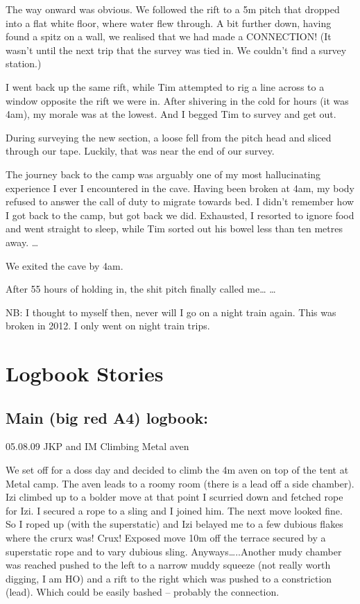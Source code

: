 The way onward was obvious. We followed the rift to a 5m pitch that
dropped into a flat white floor, where water flew through. A bit further
down, having found a spitz on a wall, we realised that we had made a
CONNECTION! (It wasn't until the next trip that the survey was tied in.
We couldn't find a survey station.)

I went back up the same rift, while Tim attempted to rig a line across
to a window opposite the rift we were in. After shivering in the cold
for hours (it was 4am), my morale was at the lowest. And I begged Tim to
survey and get out.

During surveying the new section, a loose fell from the pitch head and
sliced through our tape. Luckily, that was near the end of our survey.

The journey back to the camp was arguably one of my most hallucinating
experience I ever I encountered in the cave. Having been broken at 4am,
my body refused to answer the call of duty to migrate towards bed. I
didn't remember how I got back to the camp, but got back we did.
Exhausted, I resorted to ignore food and went straight to sleep, while
Tim sorted out his bowel less than ten metres away. \ldots{}

We exited the cave by 4am.

After 55 hours of holding in, the shit pitch finally called me\ldots{}
\ldots{}

NB: I thought to myself then, never will I go on a night train again.
This was broken in 2012. I only went on night train trips.


\section{Logbook Stories}\label{logbook-stories}

\subsection{Main (big red A4) logbook:}\label{main-big-red-a4-logbook}

05.08.09 JKP and IM Climbing Metal aven

We set off for a doss day and decided to climb the 4m aven on top of the
tent at Metal camp. The aven leads to a roomy room (there is a lead off
a side chamber). Izi climbed up to a bolder move at that point I
scurried down and fetched rope for Izi. I secured a rope to a sling and
I joined him. The next move looked fine. So I roped up (with the
superstatic) and Izi belayed me to a few dubious flakes where the crurx
was! Crux! Exposed move 10m off the terrace secured by a superstatic
rope and to vary dubious sling. Anyways\ldots{}..Another mudy chamber
was reached pushed to the left to a narrow muddy squeeze (not really
worth digging, I am HO) and a rift to the right which was pushed to a
constriction (lead). Which could be easily bashed -- probably the
connection.

